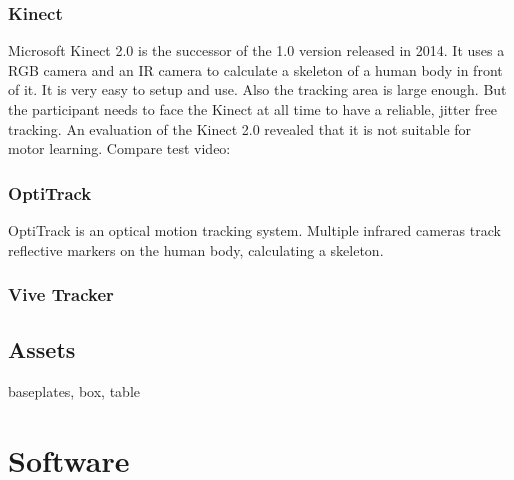 \subsubsection{Kinect}
Microsoft Kinect 2.0 is the successor of the 1.0 version released in 2014. It uses a RGB camera and an IR camera to calculate a skeleton of a human body in front of it. It is very easy to setup and use. Also the tracking area is large enough. But the participant needs to face the Kinect at all time to have a reliable, jitter free tracking. An evaluation of the Kinect 2.0 revealed that it is not suitable for motor learning. Compare test video: %
\subsubsection{OptiTrack}
OptiTrack is an optical motion tracking system. Multiple infrared cameras track reflective markers on the human body, calculating a skeleton.
\subsubsection{Vive Tracker}
\subsection{Assets}
baseplates, box, table
\section{Software}
